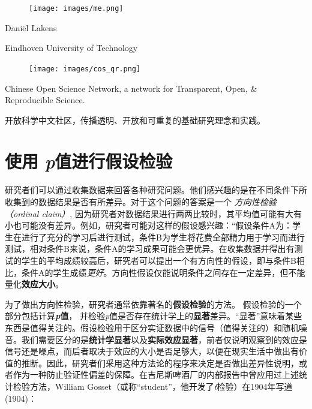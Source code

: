\documentclass[
  letterpaper,
  DIV=11,
  numbers=noendperiod]{scrreprt}
\begin{document}
\begin{figure}

\texttt{[image: images/me.png]} \hfill{}

\end{figure}

Daniël Lakens

Eindhoven University of Technology

\begin{figure}

\texttt{[image: images/cos\_qr.png]} \hfill{}

\end{figure}

Chinese Open Science Network, a network for Transparent, Open, \&
Reproducible Science.

开放科学中文社区，传播透明、开放和可重复的基础研究理念和实践。


\hypertarget{sec-pvalue}{%
\chapter{\texorpdfstring{使用
\emph{p}值进行假设检验}{使用 p值进行假设检验}}\label{sec-pvalue}}

研究者们可以通过收集数据来回答各种研究问题。他们感兴趣的是在不同条件下所收集到的数据结果是否有所差异。对于这个问题的答案是一个
\emph{方向性检验（ordinal claim）},
因为研究者对数据结果进行两两比较时，其平均值可能有大有小也可能没有差异。例如，研究者可能对这样的假设感兴趣：``假设条件A为：学生在进行了充分的学习后进行测试，条件B为学生将花费全部精力用于学习而进行测试，相对条件B来说，条件A的学习成果可能会更优异。在收集数据并得出有测试的学生的平均成绩较高后，研究者可以提出一个有方向性的假设，即与条件B相比，条件A的学生成绩\emph{更好}。方向性假设仅能说明条件之间存在一定差异，但不能量化\textbf{效应大小}。

为了做出方向性检验，研究者通常依靠著名的\textbf{假设检验}的方法。
假设检验的一个部分包括计算\textbf{\emph{p}值}，
并检验\emph{p}值是否存在统计学上的\textbf{显著}差异。``显著''意味着某些东西是值得关注的。假设检验用于区分实证数据中的信号（值得关注的）和随机噪音。我们需要区分的是\textbf{统计学显著}以及\textbf{实际效应显著}，前者仅说明观察到的效应是信号还是噪点，而后者取决于效应的大小是否足够大，以便在现实生活中做出有价值的推断。因此，研究者们采用这种方法论的程序来决定是否做出差异性说明，或者作为一种防止验证性偏差的保障。在吉尼斯啤酒厂的内部报告中曾应用过上述统计检验方法，William
Gosset（或称``student''，他开发了\emph{t}检验）在1904年写道 (1904)：
\end{document}
